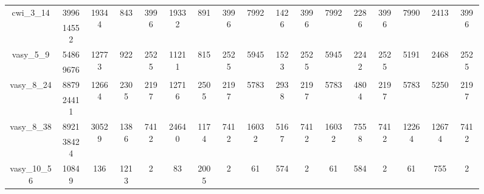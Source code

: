 \documentclass[../master/master.tex]{subfiles}
\begin{document}
\begin{figure}
\begin{adjustbox}{angle=90}
\begin{tabular}{ |c|c||c|c|c||c|c|c||c|c|c||c|c|c||c|c|c| }
\hline
\multirow{2}{3.6em}{cwi\_3\_14} & 3996 & \multirow{2}{3.6em}{19344} & \multirow{2}{3.6em}{843 } & \multirow{2}{3.6em}{3996} & \multirow{2}{3.6em}{19332} & \multirow{2}{3.6em}{891 } & \multirow{2}{3.6em}{3996} & \multirow{2}{3.6em}{7992} & \multirow{2}{3.6em}{1426 } & \multirow{2}{3.6em}{3996} & \multirow{2}{3.6em}{7992} & \multirow{2}{3.6em}{2286 } & \multirow{2}{3.6em}{3996} & \multirow{2}{3.6em}{7990} & \multirow{2}{3.6em}{2413 } & \multirow{2}{3.6em}{3996} \\
\cline{2-2}
 & 14552  &  &  &  &  &  &  &  &  &  &  &  &  &  &  &  \\
\hline
\multirow{2}{3.6em}{vasy\_5\_9} & 5486 & \multirow{2}{3.6em}{12773} & \multirow{2}{3.6em}{922 } & \multirow{2}{3.6em}{2525} & \multirow{2}{3.6em}{11211} & \multirow{2}{3.6em}{815 } & \multirow{2}{3.6em}{2525} & \multirow{2}{3.6em}{5945} & \multirow{2}{3.6em}{1523 } & \multirow{2}{3.6em}{2525} & \multirow{2}{3.6em}{5945} & \multirow{2}{3.6em}{2242 } & \multirow{2}{3.6em}{2525} & \multirow{2}{3.6em}{5191} & \multirow{2}{3.6em}{2468 } & \multirow{2}{3.6em}{2525} \\
\cline{2-2}
 & 9676  &  &  &  &  &  &  &  &  &  &  &  &  &  &  &  \\
\hline
\multirow{2}{3.6em}{vasy\_8\_24} & 8879 & \multirow{2}{3.6em}{12664} & \multirow{2}{3.6em}{2305 } & \multirow{2}{3.6em}{2197} & \multirow{2}{3.6em}{12716} & \multirow{2}{3.6em}{2505 } & \multirow{2}{3.6em}{2197} & \multirow{2}{3.6em}{5783} & \multirow{2}{3.6em}{2938 } & \multirow{2}{3.6em}{2197} & \multirow{2}{3.6em}{5783} & \multirow{2}{3.6em}{4804 } & \multirow{2}{3.6em}{2197} & \multirow{2}{3.6em}{5783} & \multirow{2}{3.6em}{5250 } & \multirow{2}{3.6em}{2197} \\
\cline{2-2}
 & 24411  &  &  &  &  &  &  &  &  &  &  &  &  &  &  &  \\
\hline
\multirow{2}{3.6em}{vasy\_8\_38} & 8921 & \multirow{2}{3.6em}{30529} & \multirow{2}{3.6em}{1386 } & \multirow{2}{3.6em}{7412} & \multirow{2}{3.6em}{24640} & \multirow{2}{3.6em}{1174 } & \multirow{2}{3.6em}{7412} & \multirow{2}{3.6em}{16032} & \multirow{2}{3.6em}{5167 } & \multirow{2}{3.6em}{7412} & \multirow{2}{3.6em}{16032} & \multirow{2}{3.6em}{7558 } & \multirow{2}{3.6em}{7412} & \multirow{2}{3.6em}{12264} & \multirow{2}{3.6em}{12674 } & \multirow{2}{3.6em}{7412} \\
\cline{2-2}
 & 38424  &  &  &  &  &  &  &  &  &  &  &  &  &  &  &  \\
\hline
\multirow{2}{3.6em}{vasy\_10\_56} & 10849 & \multirow{2}{3.6em}{136} & \multirow{2}{3.6em}{1213 } & \multirow{2}{3.6em}{2} & \multirow{2}{3.6em}{83} & \multirow{2}{3.6em}{2005 } & \multirow{2}{3.6em}{2} & \multirow{2}{3.6em}{61} & \multirow{2}{3.6em}{574 } & \multirow{2}{3.6em}{2} & \multirow{2}{3.6em}{61} & \multirow{2}{3.6em}{584 } & \multirow{2}{3.6em}{2} & \multirow{2}{3.6em}{61} & \multirow{2}{3.6em}{755 } & \multirow{2}{3.6em}{2} \\

\end{tabular}
\end{adjustbox}
\end{figure}
\end{document}
